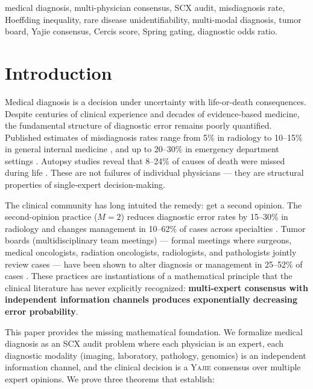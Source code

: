 \documentclass[11pt,a4paper]{article}
\theoremstyle{definition}
\newcommand{\Yajie}{\textsc{Yajie}}
\newcommand{\SCX}{\textsc{SCX}}
\begin{document}
\vspace{4pt}
medical diagnosis, multi-physician consensus, SCX audit, misdiagnosis rate,
Hoeffding inequality, rare disease unidentifiability, multi-modal diagnosis,
tumor board, Yajie consensus, Cercis score, Spring gating, diagnostic odds ratio.

\section{Introduction}
\label{sec:intro}

Medical diagnosis is a decision under uncertainty with life-or-death consequences.
Despite centuries of clinical experience and decades of evidence-based medicine,
the fundamental structure of diagnostic error remains poorly quantified.
Published estimates of misdiagnosis rates range from 5\% in radiology \cite{berlin2007accuracy}
to 10--15\% in general internal medicine \cite{graber2005diagnostic}, and up
to 20--30\% in emergency department settings \cite{newman2013diagnostic}.
Autopsy studies reveal that 8--24\% of causes of death were missed during life
\cite{shojania2003changes}. These are not failures of individual physicians --- they
are structural properties of single-expert decision-making.

The clinical community has long intuited the remedy: get a second opinion.
The second-opinion practice ($M=2$) reduces diagnostic error rates by 15--30\%
in radiology \cite{bender2019second} and changes management in 10--62\% of cases
across specialties \cite{payne2014impact}. Tumor boards (multidisciplinary team meetings) --- formal
meetings where surgeons, medical oncologists, radiation oncologists, radiologists,
and pathologists jointly review cases --- have been shown to alter diagnosis or
management in 25--52\% of cases \cite{pillay2016impact}. These practices are
instantiations of a mathematical principle that the clinical literature has
never explicitly recognized: \textbf{multi-expert consensus with independent
information channels produces exponentially decreasing error probability}.

This paper provides the missing mathematical foundation. We formalize medical
diagnosis as an \SCX{} audit problem where each physician is an expert, each
diagnostic modality (imaging, laboratory, pathology, genomics) is an independent
information channel, and the clinical decision is a \Yajie{} consensus over
multiple expert opinions. We prove three theorems that establish:
\end{document}
